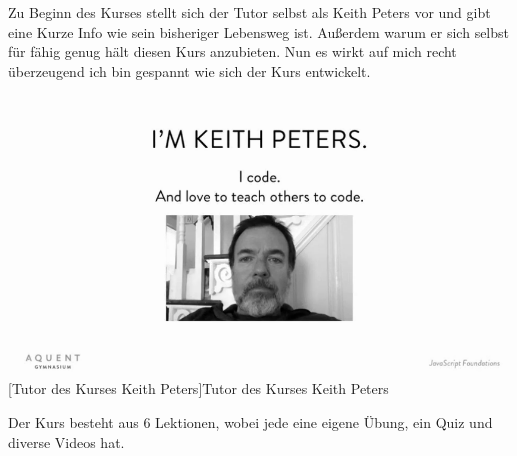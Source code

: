 \documentclass[12pt,a4paper,bibliography=totocnumbered,listof=totocnumbered]{scrartcl}
\begin{document}
Zu Beginn des Kurses stellt sich der Tutor selbst als Keith Peters vor und gibt eine Kurze Info wie sein bisheriger Lebensweg ist. Außerdem warum er sich selbst für fähig genug hält diesen Kurs anzubieten. Nun es wirkt auf mich recht überzeugend ich bin gespannt wie sich der Kurs entwickelt.


\vspace{1em}
\begin{minipage}{\linewidth}
	\centering
	\includegraphics[width=1\linewidth]{Bilder/tutor.png}
	[Tutor des Kurses Keith Peters]{Tutor des Kurses Keith Peters \footnotemark }
	\label{fig:osgi}
\end{minipage}

Der Kurs besteht aus 6 Lektionen, wobei jede eine eigene Übung, ein Quiz und diverse Videos hat.\newline
\end{document}
